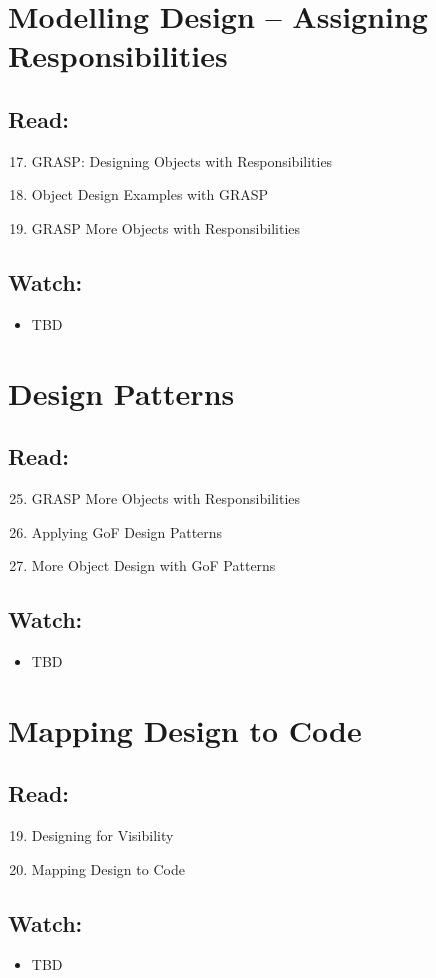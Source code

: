 \documentclass[10pt,t,a4paper]{article}
\begin{document}
\section{Modelling Design -- Assigning Responsibilities}
\label{sec-7}
\subsection{Read:}
\label{sec-7-1}
\begin{enumerate}
\setcounter{enumi}{16}
\item GRASP: Designing Objects with Responsibilities
\item Object Design Examples with GRASP
\setcounter{enumi}{24}
\item GRASP More Objects with Responsibilities
\end{enumerate}

\subsection{Watch:}
\label{sec-7-2}
\begin{itemize}
\item TBD
\end{itemize}
\section{Design Patterns}
\label{sec-8}
\subsection{Read:}
\label{sec-8-1}
\begin{enumerate}
\setcounter{enumi}{24}
\item GRASP More Objects with Responsibilities
\item Applying GoF Design Patterns
\setcounter{enumi}{35}
\item More Object Design with GoF Patterns
\end{enumerate}

\subsection{Watch:}
\label{sec-8-2}
\begin{itemize}
\item TBD
\end{itemize}
\section{Mapping Design to Code}
\label{sec-9}
\subsection{Read:}
\label{sec-9-1}
\begin{enumerate}
\setcounter{enumi}{18}
\item Designing for Visibility
\item Mapping Design to Code
\end{enumerate}

\subsection{Watch:}
\label{sec-9-2}
\begin{itemize}
\item TBD
\end{itemize}
\end{document}
